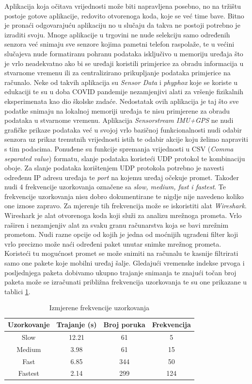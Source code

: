 \documentclass[times, utf8, diplomski]{fer}
\begin{document}
Aplikacija koja očitava vrijednosti može biti napravljena posebno, no na tržištu postoje gotove aplikacije, redovito otvorenoga koda, koje se već time bave.
Bitno je pronaći odgovarajuću aplikaciju no u slučaju da takva ne postoji potrebno je izraditi svoju. Mnoge aplikacije u trgovini ne nude selekciju samo određenih senzora
već snimaju sve senzore kojima pametni telefon raspolaže, te u većini slučajeva nude formatiranu pohranu podataka isključivo u memoriju uređaja što je vrlo neadekvatno ako bi se uređaji
koristili primjerice za obradu informacija u stvarnome vremenu ili za centralizirano prikupljanje podataka primjerice na računalo. Neke od takvih aplikacija su
\textit{Sensor Data} i \textit{phyphox} koje se koriste u edukaciji te su u doba COVID pandemije nezamjenjivi alati za vršenje fizikalnih eksperimenata kao dio
školske zadaće. Nedostatak ovih aplikacija je taj što sve podatke snimaju na lokalnoj memoriji uređaja te nisu primjerene za obradu podataka u stvarnome vremenu.
Aplikacija \textit{Sensorstream IMU+GPS} ne nudi grafičke prikaze podataka već u svojoj vrlo bazičnoj funkcionalnosti nudi odabir senzora uz prikaz trenutnih
vrijednosti istih te odabir akcije koju želimo napraviti s tim podacima. Ponuđene su funkcije spremanja vrijednosti u CSV (\textit{Comma separated value}) formatu,
slanje podataka koristeći UDP protokol te kombinaciju oboje. Za slanje podataka korištenjem UDP protokola potrebno je navesti određenu IP adresu uređaja te \textit{port} na
kojemu uređaj očekuje promet. Također nudi 4 frekvencije uzorkovanja označene sa \textit{slow, medium, fast i fastest}. Te frekvencije uzorkovanja nisu dobro dokumentirane
te nigdje nije navedeno koliko one iznose zapravo. Za mjerenje tih frekvencija može se iskoristiti alat \textit{Wireshark}. Wireshark je alat otvorenoga koda koji
služi za analizu mrežnoga prometa. Vrlo raširen i nezamjenjiv alat za svaku granu računarstva koja se bavi mrežnim prometom. Nudi razne opcije od kojih je jedna 
od moćnijih ugrađeni filter koji vrlo precizno može naći određeni paket unutar snimke mrežnog prometa. Koristeći tu mogućnost promet se može snimiti na računalu
te kasnije filtrirati samo one pakete koje mobilni uređaj šalje. Gledajući vremenske indekse prvoga i posljednjega paketa dobivamo ukupno trajanje
snimanja te znajući točan broj paketa može se izračunati približna frekvencija uzorkovanja te su one prikazane u tablici \ref{frekvencije}.

\begin{table} [h!]
 \centering
    \begin{tabular}{|c|c|c|c|}
        \hline
        Uzorkovanje & Trajanje (s) & Broj poruka & Frekvencija \\
        \hline
        Slow & 12.21 & 61 & 5 \\
        Medium & 3.98 & 61 & 15 \\
        Fast & 6.85 & 344 & 50 \\
        Fastest & 2.14 & 299 & 124\\
        \hline
    \end{tabular}
    \caption{Izmjerene frekvencije uzorkovanja}
    \label{frekvencije}
\end{table}
\end{document}
